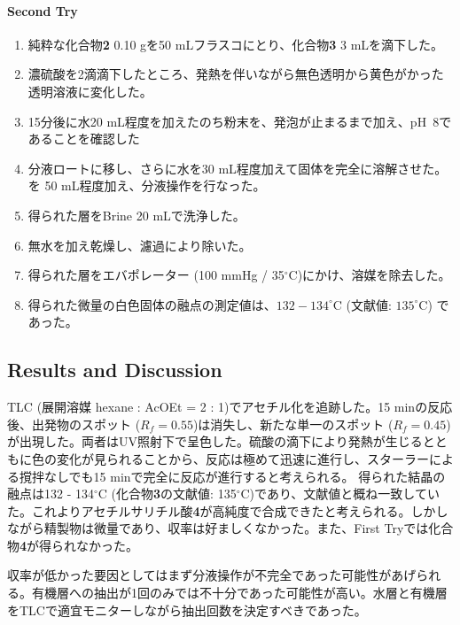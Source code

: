 \documentclass{ltjsarticle}
\theoremstyle{definition}
\numberwithin{equation}{section}
\newcommand{\D}{^\circ\text{C}}
\begin{document}
\paragraph{Second Try}
\begin{enumerate}
\item 純粋な化合物\textbf{2} 0.10 gを50 mLフラスコにとり、化合物\textbf{3} 3 mLを滴下した。
\item 濃硫酸を2滴滴下したところ、発熱を伴いながら無色透明から黄色がかった透明溶液に変化した。
\item 15分後に水20 mL程度を加えたのち粉末を、発泡が止まるまで加え、pH~8であることを確認した
\item 分液ロートに移し、さらに水を30 mL程度加えて固体を完全に溶解させた。を 50 mL程度加え、分液操作を行なった。
\item 得られた層をBrine 20 mLで洗浄した。
\item 無水を加え乾燥し、濾過により除いた。
\item 得られた層をエバポレーター (100 mmHg / 35$\D$)にかけ、溶媒を除去した。
\item 得られた微量の白色固体の融点の測定値は、$132-134\D$ (文献値: $135\D$) であった。
\end{enumerate}
\subsection{Results and Discussion}
TLC (展開溶媒 hexane : AcOEt = 2 : 1)でアセチル化を追跡した。15 minの反応後、出発物のスポット ($R_f = 0.55$)は消失し、新たな単一のスポット ($R_f = 0.45$) が出現した。両者はUV照射下で呈色した。硫酸の滴下により発熱が生じるとともに色の変化が見られることから、反応は極めて迅速に進行し、スターラーによる撹拌なしでも15 minで完全に反応が進行すると考えられる。
得られた結晶の融点は132 - 134$\D$ (化合物\textbf{3}の文献値: 135$\D$)であり、文献値と概ね一致していた。これよりアセチルサリチル酸\textbf{4}が高純度で合成できたと考えられる。しかしながら精製物は微量であり、収率は好ましくなかった。また、First Tryでは化合物\textbf{4}が得られなかった。

収率が低かった要因としてはまず分液操作が不完全であった可能性があげられる。有機層への抽出が1回のみでは不十分であった可能性が高い。水層と有機層をTLCで適宜モニターしながら抽出回数を決定すべきであった。
\end{document}
